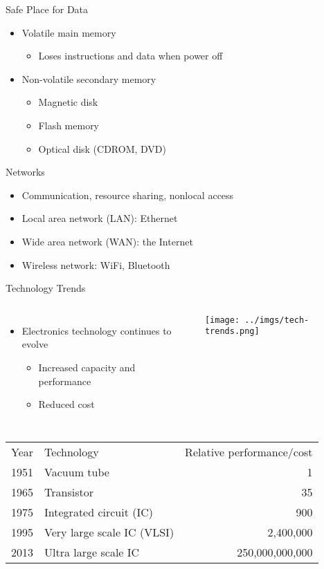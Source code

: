 \documentclass{beamer}
\begin{document}
\begin{frame}{Safe Place for Data}
\begin{itemize}
\item Volatile main memory
\begin{itemize}
\item Loses instructions and data when power off
\end{itemize}
\item Non-volatile secondary memory
\begin{itemize}
\item Magnetic disk
\item Flash memory
\item Optical disk (CDROM, DVD)
\end{itemize}
\end{itemize}
\end{frame}

\begin{frame}{Networks}
\begin{itemize}
\item Communication, resource sharing, nonlocal access
\item Local area network (LAN): Ethernet
\item Wide area network (WAN): the Internet
\item Wireless network: WiFi, Bluetooth
\end{itemize}
\end{frame}

\begin{frame}{Technology Trends}
\begin{columns}[c]
\begin{itemize}
\item Electronics technology continues to evolve
\begin{itemize}
\item Increased capacity and performance
\item Reduced cost
\end{itemize}
\end{itemize}
\texttt{[image: ../imgs/tech-trends.png]}
\end{columns}
\begin{tabular}{l l r}
Year & Technology & Relative performance/cost \\
1951 & Vacuum tube & 1 \\
1965 & Transistor & 35 \\
1975 & Integrated circuit (IC) & 900 \\
1995 & Very large scale IC (VLSI) & 2,400,000 \\
2013 & Ultra large scale IC & 250,000,000,000 \\
\end{tabular}
\end{frame}
\end{document}
